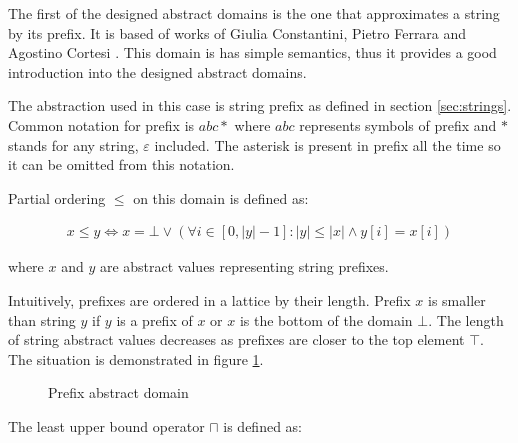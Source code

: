 \documentclass[12pt,final,oneside]{fithesis2}
\theoremstyle{definition}
\begin{document}
The first of the designed abstract domains is the one that approximates
a string by its prefix. It is based of works of Giulia Constantini,
Pietro Ferrara and Agostino Cortesi \cite{Constantini11-1}. This domain
is has simple semantics, thus it provides a good introduction into the
designed abstract domains.

The abstraction used in this case is string prefix as defined in section
\ref{sec:strings}. Common notation for prefix is $abc*$ where $abc$
represents symbols of prefix and $*$ stands for any string, $\varepsilon$
included. The asterisk is present in prefix all the time so it can be
omitted from this notation.

Partial ordering $\leq$ on this domain is defined as:

\begin{align*}
x \leq y \Leftrightarrow
  x = \bot \lor (\forall i \in [0, |y| - 1] :
  |y| \leq |x| \land y[i] = x[i])
\end{align*}

where $x$ and $y$ are abstract values representing string prefixes.

Intuitively, prefixes are ordered in a lattice by their length. Prefix
$x$ is smaller than string $y$ if $y$ is a
prefix of $x$ or $x$ is the bottom of the domain $\bot$.
The length of string abstract values decreases as prefixes are closer to
the top element $\top$. The situation is demonstrated in figure
\ref{fig:prefixlattice}.

\begin{figure}[ht]
\centering
{}
\caption{Prefix abstract domain}
\label{fig:prefixlattice}
\end{figure}

The least upper bound operator $\sqcap$ is defined as:
\end{document}
